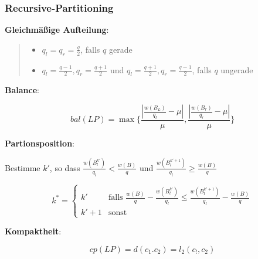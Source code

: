         \subsubsection{Recursive-Partitioning} %
        \label{ssub:recursive_partitioning}

          \par \textbf{Gleichmäßige Aufteilung}:

            \begin{quote}
              \begin{itemize}
                \item $q_l = q_r = \frac{q}{2}$, falls $q$ gerade
                \item $q_l = \frac{q - 1}{2}, q_r = \frac{q + 1}{2}$ und $q_l = \frac{q + 1}{2}, q_r = \frac{q - 1}{2}$, falls $q$ ungerade
              \end{itemize}
            \end{quote}

          \par \textbf{Balance}:

          \begin{equation*}
            bal(LP) = \max \{ \frac{|\frac{w(B_L)}{q_l} - \mu|}{\mu}, \frac{|\frac{w(B_r)}{q_r} - \mu|}{\mu}\}
          \end{equation*}

          \par \textbf{Partionsposition}:

          \indent \par Bestimme $k'$, so dass $\frac{w(B_{l}^{k'})}{q_l} < \frac{w(B)}{q}$ und $\frac{w(B_{l}^{k' + 1})}{q_l} \geq \frac{w(B)}{q}$

          \begin{equation*}
            k^* = 
              \begin{cases}
                k' & \text{falls } \frac{w(B)}{q} - \frac{w(B_{l}^{k'})}{q_l} \leq \frac{w(B_{l}^{k' + 1})}{q_l} - \frac{w(B)}{q} \\
                k' + 1 &\text{sonst}
              \end{cases}
          \end{equation*}
        
          \par \textbf{Kompaktheit}:

          \begin{equation*}
            cp(LP) = d(c_1. c_2) = l_2(c_!, c_2)
          \end{equation*}

